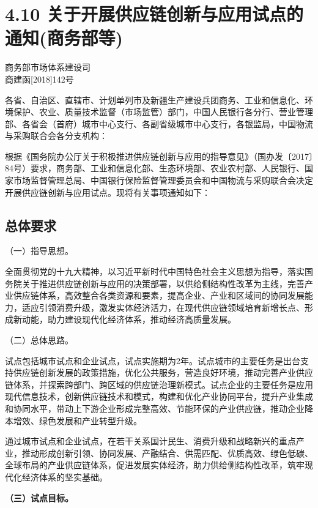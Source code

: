 \chapter{4.10 关于开展供应链创新与应用试点的通知(商务部等)} %

\begin{center}
商务部市场体系建设司 \\
商建函[2018]142号
\end{center}

\noindent 各省、自治区、直辖市、计划单列市及新疆生产建设兵团商务、工业和信息化、环境保护、农业、质量技术监督（市场监管）部门，中国人民银行各分行、营业管理部、各省会（首府）城市中心支行、各副省级城市中心支行，各银监局，中国物流与采购联合会各分支机构：

根据《国务院办公厅关于积极推进供应链创新与应用的指导意见》（国办发〔2017〕84号）要求，商务部、工业和信息化部、生态环境部、农业农村部、人民银行、国家市场监督管理总局、中国银行保险监督管理委员会和中国物流与采购联合会决定开展供应链创新与应用试点。现将有关事项通知如下：

\section{总体要求}

  （一）指导思想。

全面贯彻党的十九大精神，以习近平新时代中国特色社会主义思想为指导，落实国务院关于推进供应链创新与应用的决策部署，以供给侧结构性改革为主线，完善产业供应链体系，高效整合各类资源和要素，提高企业、产业和区域间的协同发展能力，适应引领消费升级，激发实体经济活力，在现代供应链领域培育新增长点、形成新动能，助力建设现代化经济体系，推动经济高质量发展。

  （二）总体思路。

试点包括城市试点和企业试点，试点实施期为2年。试点城市的主要任务是出台支持供应链创新发展的政策措施，优化公共服务，营造良好环境，推动完善产业供应链体系，并探索跨部门、跨区域的供应链治理新模式。试点企业的主要任务是应用现代信息技术，创新供应链技术和模式，构建和优化产业协同平台，提升产业集成和协同水平，带动上下游企业形成完整高效、节能环保的产业供应链，推动企业降本增效、绿色发展和产业转型升级。

通过城市试点和企业试点，在若干关系国计民生、消费升级和战略新兴的重点产业，推动形成创新引领、协同发展、产融结合、供需匹配、优质高效、绿色低碳、全球布局的产业供应链体系，促进发展实体经济，助力供给侧结构性改革，筑牢现代化经济体系的坚实基础。

{ \bf （三）试点目标。 }

